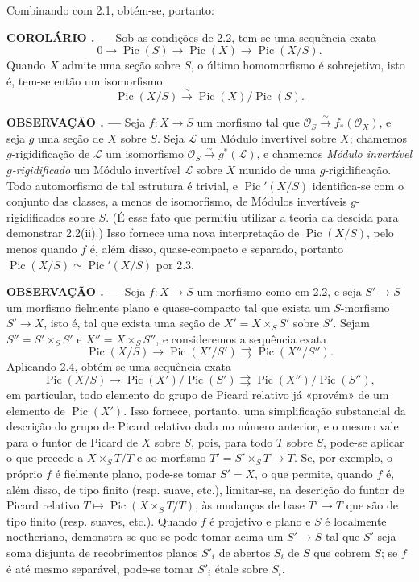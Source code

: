 \documentclass[11pt,twoside,openany]{book}
\numberwithin{equation}{section}
\newcommand{\src}[1]{%
  \phantomsection\hypertarget{src:#1}{}%
  \marginpar{\raggedleft\footnotesize\sffamily #1}%
}
\theoremstyle{plain}
\theoremstyle{definition}
\theoremstyle{remark}
\newcommand{\result}[2]{%
  \par\medskip\noindent\textbf{#1%
  \if\relax\detokenize{#2}\relax\else\space#2\fi. ---}\enspace
}
\newcommand{\FgaUnitKey}{frontmatter}
\renewcommand{\src}[1]{%
  \phantomsection\hypertarget{src:\FgaUnitKey:#1}{}%
  \marginpar{\raggedleft\footnotesize\sffamily #1}%
}
\begin{document}
Combinando com 2.1, obtém-se, portanto:

\result{COROLÁRIO}{2.4} Sob as condições de 2.2, tem-se uma sequência exata
\[
0\longrightarrow\operatorname{Pic}(S)\longrightarrow\operatorname{Pic}(X)
\longrightarrow\operatorname{Pic}(X/S).
\]
Quando $X$ admite uma seção sobre $S$, o último homomorfismo é sobrejetivo,
isto é, tem-se então um isomorfismo
\[
\operatorname{Pic}(X/S)\xrightarrow{\sim}
\operatorname{Pic}(X)/\operatorname{Pic}(S).
\]

\result{OBSERVAÇÃO}{2.5} Seja $f:X\longrightarrow S$ um morfismo tal que
$\mathcal O_S\xrightarrow{\sim}f_*(\mathcal O_X)$, e seja $g$ uma seção de
$X$ sobre $S$. Seja $\mathcal L$ um Módulo invertível sobre $X$; chamemos
$g$-rigidificação de $\mathcal L$ um isomorfismo
$\mathcal O_S\xrightarrow{\sim}g^*(\mathcal L)$, e chamemos \emph{Módulo
invertível $g$-rigidificado} um Módulo invertível $\mathcal L$ sobre $X$ munido
de uma $g$-rigidificação. Todo automorfismo de tal estrutura é trivial, e
$\operatorname{Pic}'(X/S)$ identifica-se com o conjunto das classes, a menos de
isomorfismo, de Módulos invertíveis $g$-rigidificados sobre $S$. (É esse fato que permitiu
utilizar a teoria da descida para demonstrar 2.2(ii).) Isso fornece uma nova
interpretação de $\operatorname{Pic}(X/S)$, pelo menos quando $f$ é, além disso,
quase-compacto e separado, portanto
$\operatorname{Pic}(X/S)\simeq\operatorname{Pic}'(X/S)$ por 2.3.
\src{148}
\result{OBSERVAÇÃO}{2.6} Seja $f:X\longrightarrow S$ um morfismo como em
2.2, e seja $S'\longrightarrow S$ um morfismo fielmente plano e
quase-compacto tal que exista um $S$-morfismo $S'\longrightarrow X$, isto é,
tal que exista uma seção de $X'=X\times_SS'$ sobre $S'$. Sejam
$S''=S'\times_SS'$ e $X''=X\times_SS''$, e consideremos a sequência exata
\[
\operatorname{Pic}(X/S)\longrightarrow\operatorname{Pic}(X'/S')
\rightrightarrows\operatorname{Pic}(X''/S'').
\]
Aplicando 2.4, obtém-se uma sequência exata
\[
\operatorname{Pic}(X/S)\longrightarrow
\operatorname{Pic}(X')/\operatorname{Pic}(S')
\rightrightarrows
\operatorname{Pic}(X'')/\operatorname{Pic}(S''),
\]
em particular, todo elemento do grupo de Picard relativo já «provém» de um
elemento de $\operatorname{Pic}(X')$. Isso fornece, portanto, uma simplificação
substancial da descrição do grupo de Picard relativo dada no número anterior,
e o mesmo vale para o funtor de Picard de $X$ sobre $S$, pois, para todo $T$
sobre $S$, pode-se aplicar o que precede a $X\times_ST/T$ e ao morfismo
$T'=S'\times_ST\longrightarrow T$. Se, por exemplo, o próprio $f$ é fielmente
plano, pode-se tomar $S'=X$, o que permite, quando $f$ é, além disso, de tipo
finito (resp. suave, etc.), limitar-se, na descrição do funtor de Picard relativo
$T\longmapsto\operatorname{Pic}(X\times_ST/T)$, às mudanças de base
$T'\longrightarrow T$ que são de tipo finito (resp. suaves, etc.). Quando $f$
é projetivo e plano e $S$ é localmente noetheriano, demonstra-se que se pode
tomar acima um $S'\longrightarrow S$ tal que $S'$ seja soma disjunta de
recobrimentos planos $S'_i$ de abertos $S_i$ de $S$ que cobrem $S$; se $f$ é
até mesmo separável, pode-se tomar $S'_i$ étale sobre $S_i$.
\end{document}
